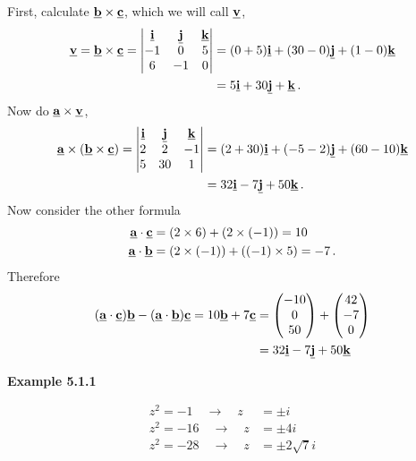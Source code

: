 First, calculate $\underline{\mathbf{b}} \times \underline{\mathbf{c}}$, which we will call $\underline{\mathbf{v}}$,
\begin{align*}
    \underline{\mathbf{v}} = \underline{\mathbf{b}} \times \underline{\mathbf{c}} = \begin{vmatrix}
        \underline{\mathbf{i}} & \underline{\mathbf{j}} & \underline{\mathbf{k}} \\
        -1 & 0 & 5 \\
        6 & -1 & 0
    \end{vmatrix} &= (0+5)\underline{\mathbf{i}} + (30-0)\underline{\mathbf{j}} + (1-0)\underline{\mathbf{k}}\\
    &= 5\underline{\mathbf{i}} + 30\underline{\mathbf{j}} + \underline{\mathbf{k}} \,.
\end{align*}
Now do $\underline{\mathbf{a}} \times \underline{\mathbf{v}}$,
\begin{align*}
    \underline{\mathbf{a}} \times (\underline{\mathbf{b}} \times \underline{\mathbf{c}}) = \begin{vmatrix}
        \underline{\mathbf{i}} & \underline{\mathbf{j}} & \underline{\mathbf{k}} \\
        2 & 2 & -1 \\
        5 & 30 & 1
    \end{vmatrix} &= (2+30)\underline{\mathbf{i}} + (-5-2)\underline{\mathbf{j}} + (60-10)\underline{\mathbf{k}}\\
    &= 32\underline{\mathbf{i}} - 7\underline{\mathbf{j}} + 50\underline{\mathbf{k}} \,.
\end{align*}
Now consider the other formula
\begin{align*}
    \underline{\mathbf{a}}\cdot\underline{\mathbf{c}} &= (2 \times 6) + (2\times(-1)) = 10\\
    \underline{\mathbf{a}}\cdot\underline{\mathbf{b}} &= (2\times(-1))+((-1)\times5)=-7 \, .
\end{align*}
Therefore
\begin{align*}
    (\underline{\mathbf{a}}\cdot\underline{\mathbf{c}})\underline{\mathbf{b}} - (\underline{\mathbf{a}}\cdot\underline{\mathbf{b}})\underline{\mathbf{c}} = 10\underline{\mathbf{b}} + 7\underline{\mathbf{c}} &= \begin{pmatrix}
        -10 \\ 0 \\ 50
    \end{pmatrix} + \begin{pmatrix}
        42 \\ -7 \\ 0
    \end{pmatrix} \\
    &= 32 \underline{\mathbf{i}} - 7 \underline{\mathbf{j}} + 50 \underline{\mathbf{k}}
\end{align*}

\textbf{Example 5.1.1} \par

\begin{align*}
    z^2 = -1 \quad \rightarrow \quad z &= \pm i\\
    z^2 = -16 \quad \rightarrow \quad z &= \pm 4i\\
    z^2 = -28 \quad \rightarrow \quad z &= \pm 2\sqrt{7} i
\end{align*}

